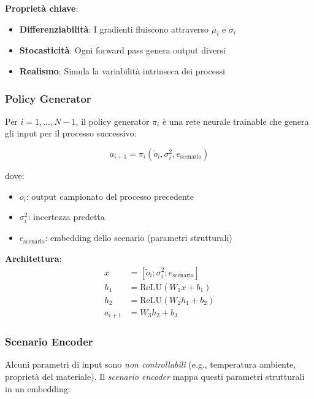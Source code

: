 \documentclass[11pt,a4paper]{article}
\begin{document}
\textbf{Proprietà chiave}:
\begin{itemize}
    \item \textbf{Differenziabilità}: I gradienti fluiscono attraverso $\mu_i$ e $\sigma_i$
    \item \textbf{Stocasticità}: Ogni forward pass genera output diversi
    \item \textbf{Realismo}: Simula la variabilità intrinseca dei processi
\end{itemize}

\subsubsection{Policy Generator}

Per $i = 1, \ldots, N-1$, il policy generator $\pi_i$ è una rete neurale trainable che genera gli input per il processo successivo:

\begin{equation}
a_{i+1} = \pi_i(\tilde{o}_i, \sigma_i^2, e_{\text{scenario}})
\end{equation}

dove:
\begin{itemize}
    \item $\tilde{o}_i$: output campionato del processo precedente
    \item $\sigma_i^2$: incertezza predetta
    \item $e_{\text{scenario}}$: embedding dello scenario (parametri strutturali)
\end{itemize}

\textbf{Architettura}:
\begin{equation}
\begin{aligned}
x &= [\tilde{o}_i; \sigma_i^2; e_{\text{scenario}}] \\
h_1 &= \text{ReLU}(W_1 x + b_1) \\
h_2 &= \text{ReLU}(W_2 h_1 + b_2) \\
a_{i+1} &= W_3 h_2 + b_3
\end{aligned}
\end{equation}

\subsubsection{Scenario Encoder}

Alcuni parametri di input sono \textit{non controllabili} (e.g., temperatura ambiente, proprietà del materiale). Il \textit{scenario encoder} mappa questi parametri strutturali in un embedding:
\end{document}
